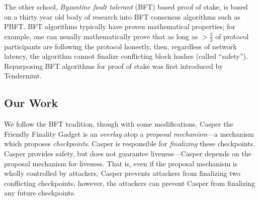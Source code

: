 \documentclass[12pt]{article}
\begin{document}
The other school, \textit{Byzantine fault tolerant} (BFT) based proof of stake, is based on a thirty year old body of research into BFT consensus algorithms such as PBFT\cite{castro1999practical}. BFT algorithms typically have proven mathematical properties; for example, one can usually mathematically prove that as long as $>\frac{2}{3}$ of protocol participants are following the protocol honestly, then, regardless of network latency, the algorithm cannot finalize conflicting block hashes (called ``safety'').  Repurposing BFT algorithms for proof of stake was first introduced by Tendermint\cite{kwon2014tendermint}.

\subsection{Our Work}
We follow the BFT tradition, though with some modifications. Casper the Friendly Finality Gadget is an \textit{overlay} atop a \textit{proposal mechanism}---a mechanism which proposes \textit{checkpoints}.  Casper is responsible for \textit{finalizing} these checkpoints.  Casper provides safety, but does not guarantee liveness---Casper depends on the proposal mechanism for liveness.  That is, even if the proposal mechanism is wholly controlled by attackers, Casper prevents attackers from finalizing two conflicting checkpoints, however, the attackers can prevent Casper from finalizing any future checkpoints.
\end{document}
